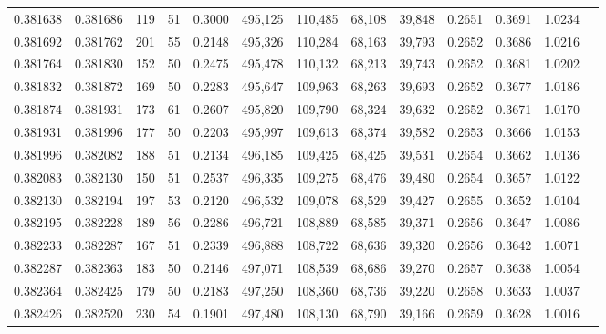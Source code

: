 \begin{tabular}{rrrrrrrrrrrrr}
0.381638 & 0.381686 &   119 &  51 &                                     0.3000 & 495,125 & 110,485 &  68,108 &  39,848 & 0.2651 & 0.3691 & 1.0234 \\
0.381692 & 0.381762 &   201 &  55 &                                     0.2148 & 495,326 & 110,284 &  68,163 &  39,793 & 0.2652 & 0.3686 & 1.0216 \\
0.381764 & 0.381830 &   152 &  50 &                                     0.2475 & 495,478 & 110,132 &  68,213 &  39,743 & 0.2652 & 0.3681 & 1.0202 \\
0.381832 & 0.381872 &   169 &  50 &                                     0.2283 & 495,647 & 109,963 &  68,263 &  39,693 & 0.2652 & 0.3677 & 1.0186 \\
0.381874 & 0.381931 &   173 &  61 &                                     0.2607 & 495,820 & 109,790 &  68,324 &  39,632 & 0.2652 & 0.3671 & 1.0170 \\
0.381931 & 0.381996 &   177 &  50 &                                     0.2203 & 495,997 & 109,613 &  68,374 &  39,582 & 0.2653 & 0.3666 & 1.0153 \\
0.381996 & 0.382082 &   188 &  51 &                                     0.2134 & 496,185 & 109,425 &  68,425 &  39,531 & 0.2654 & 0.3662 & 1.0136 \\
0.382083 & 0.382130 &   150 &  51 &                                     0.2537 & 496,335 & 109,275 &  68,476 &  39,480 & 0.2654 & 0.3657 & 1.0122 \\
0.382130 & 0.382194 &   197 &  53 &                                     0.2120 & 496,532 & 109,078 &  68,529 &  39,427 & 0.2655 & 0.3652 & 1.0104 \\
0.382195 & 0.382228 &   189 &  56 &                                     0.2286 & 496,721 & 108,889 &  68,585 &  39,371 & 0.2656 & 0.3647 & 1.0086 \\
0.382233 & 0.382287 &   167 &  51 &                                     0.2339 & 496,888 & 108,722 &  68,636 &  39,320 & 0.2656 & 0.3642 & 1.0071 \\
0.382287 & 0.382363 &   183 &  50 &                                     0.2146 & 497,071 & 108,539 &  68,686 &  39,270 & 0.2657 & 0.3638 & 1.0054 \\
0.382364 & 0.382425 &   179 &  50 &                                     0.2183 & 497,250 & 108,360 &  68,736 &  39,220 & 0.2658 & 0.3633 & 1.0037 \\
0.382426 & 0.382520 &   230 &  54 &                                     0.1901 & 497,480 & 108,130 &  68,790 &  39,166 & 0.2659 & 0.3628 & 1.0016 \\

\end{tabular}
